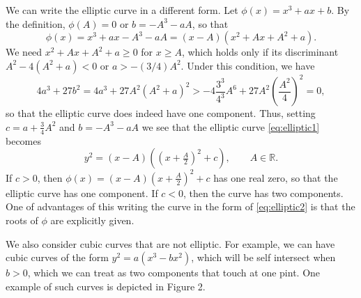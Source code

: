 \documentclass{amsart}
\theoremstyle{remark}
\def\RR{{\mathbb R}}
\begin{document}
We can write the elliptic curve in a different form. Let $\phi(x) = x^3 + a x + b$. By the definition, $\phi(A) = 0$ 
or $b = - A^3 - a A$, so that 
$$
  \phi(x) =  x^3 + a x - A^3 - a A = (x-A) (x^2 + A x +A^2+a). 
$$
We need $x^2 + A x + A^2 + a \ge 0$ for $x \ge A$, which holds only if its discriminant $A^2- 4 (A^2+a) < 0$ 
or $a > - (3/4)A^2$. Under this condition, we have 
$$
 4 a^3 + 27 b^2 = 4 a^3 + 27 A^2 (A^2+a)^2 > - 4 \frac{3^3}{4^3} A^6 +27 A^2 \left(\frac{A^2}{4}\right)^2 = 0,
$$ 
so that the elliptic curve does indeed have one component. Thus, setting $c = a + \frac{3}{4}A^2$ and 
$b = - A^3 - a A$ we see that the elliptic curve \eqref{eq:elliptic1} becomes 
\begin{equation} \label{eq:elliptic2}
      y^2 = (x-A) \left( \left (x+\tfrac{A}{2}\right)^2 + c\right), \qquad A\in \RR.
\end{equation}
If $c > 0$, then $\phi(x) = (x-A) (x+\frac{A}{2})^2 + c$ has one real zero, so that the elliptic curve has one
component. If $c < 0$, then the curve has two components. One of advantages of this writing the curve in 
the form of \eqref{eq:elliptic2} is that the roots of $\phi$ are explicitly given. 

We also consider cubic curves that are not elliptic. For example, we can have cubic curves of the form $y^2 = a (x^3 - b x^2)$, which will be self intersect 
when $b>0$, which we can treat as two components that touch at one pint. One example of such curves is depicted in Figure 2. 
\end{document}
